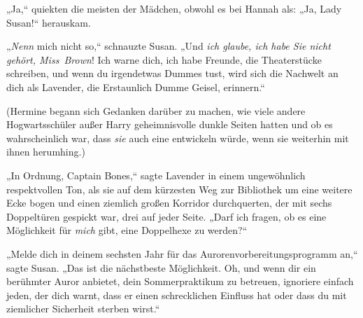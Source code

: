 „Ja,“ quiekten die meisten der Mädchen, obwohl es bei Hannah als: „Ja, Lady Susan!“ herauskam.

„\emph{Nenn} mich nicht so,“ schnauzte Susan. „Und \emph{ich glaube, ich habe Sie nicht gehört, Miss~Brown}! Ich warne dich, ich habe Freunde, die Theaterstücke schreiben, und wenn du irgendetwas Dummes tust, wird sich die Nachwelt an dich als Lavender, die Erstaunlich Dumme Geisel, erinnern.“

(Hermine begann sich Gedanken darüber zu machen, wie viele andere Hogwartsschüler außer Harry geheimnisvolle dunkle Seiten hatten und ob es wahrscheinlich war, dass \emph{sie} auch eine entwickeln würde, wenn sie weiterhin mit ihnen herumhing.)

„In Ordnung, Captain Bones,“ sagte Lavender in einem ungewöhnlich respektvollen Ton, als sie auf dem kürzesten Weg zur Bibliothek um eine weitere Ecke bogen und einen ziemlich großen Korridor durchquerten, der mit sechs Doppeltüren gespickt war, drei auf jeder Seite. „Darf ich fragen, ob es eine Möglichkeit für \emph{mich} gibt, eine Doppelhexe zu werden?“

„Melde dich in deinem sechsten Jahr für das Aurorenvorbereitungsprogramm an,“ sagte Susan. „Das ist die nächstbeste Möglichkeit. Oh, und wenn dir ein berühmter Auror anbietet, dein Sommerpraktikum zu betreuen, ignoriere einfach jeden, der dich warnt, dass er einen schrecklichen Einfluss hat oder dass du mit ziemlicher Sicherheit sterben wirst.“

